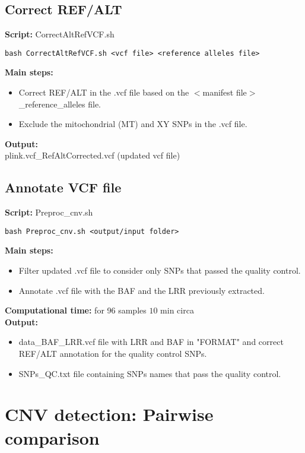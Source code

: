 \documentclass[11pt]{paper}
\begin{document}
\subsection{Correct REF/ALT}
\textbf{Script:} CorrectAltRefVCF.sh
\begin{verbatim}
bash CorrectAltRefVCF.sh <vcf file> <reference alleles file> 
\end{verbatim}
\textbf{Main steps:}\\
\vspace{-0.5cm}
\begin{itemize}
\item Correct REF/ALT in the .vcf file based on the $<$manifest file$>$\_reference\_alleles file.
\item Exclude the mitochondrial (MT) and XY SNPs in the .vcf file.
\end{itemize}
\noindent\textbf{Output:}\\
plink.vcf\_RefAltCorrected.vcf (updated vcf file)

\subsection{Annotate VCF file}
\textbf{Script:} Preproc\_cnv.sh
\begin{verbatim}
bash Preproc_cnv.sh <output/input folder>  
\end{verbatim}
\textbf{Main steps:}\\
\vspace{-0.5cm}
\begin{itemize}
\item Filter updated .vcf file to consider only SNPs that passed the quality control.
\item Annotate .vcf file with the BAF and the LRR previously extracted.   
\end{itemize}
\textbf{Computational time:} for 96 samples $10$ min circa\\ 
\textbf{Output:}
\begin{itemize}
\item data\_BAF\_LRR.vcf file with LRR and BAF in "FORMAT" and correct REF/ALT annotation for the quality control SNPs.
\item SNPs\_QC.txt file containing SNPs names that pass the quality control. 
\end{itemize}


\section{CNV detection: Pairwise comparison}
\end{document}
